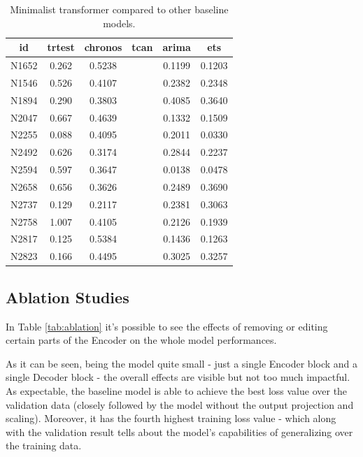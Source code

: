 \documentclass[algorithms,article,submit,pdftex,moreauthors]{Definitions/mdpi}
\begin{document}
\begin{table}[H]
	\caption{Minimalist transformer compared to other baseline models.}
	\label{tab:comparisons}
	\centering
	\begin{tabular}{c|ccccc}
		\toprule
		id   & trtest & chronos & tcan & arima & ets \\
		\midrule
		N1652 & 0.262 & 0.5238 & & 0.1199 & 0.1203 \\
		N1546 & 0.526 & 0.4107 & & 0.2382 & 0.2348 \\
		N1894 & 0.290 & 0.3803 & & 0.4085 & 0.3640 \\
		N2047 & 0.667 & 0.4639 & & 0.1332 & 0.1509 \\
		N2255 & 0.088 & 0.4095 & & 0.2011 & 0.0330 \\
		N2492 & 0.626 & 0.3174 & & 0.2844 & 0.2237 \\
		N2594 & 0.597 & 0.3647 & & 0.0138 & 0.0478 \\
		N2658 & 0.656 & 0.3626 & & 0.2489 & 0.3690 \\
		N2737 & 0.129 & 0.2117 & & 0.2381 & 0.3063 \\
		N2758 & 1.007 & 0.4105 & & 0.2126 & 0.1939 \\
		N2817 & 0.125 & 0.5384 & & 0.1436 & 0.1263 \\
		N2823 & 0.166 & 0.4495 & & 0.3025 & 0.3257 \\
		\bottomrule
	\end{tabular}
\end{table}

\subsection{Ablation Studies}

In Table \ref{tab:ablation} it's possible to see the effects of removing or editing certain parts of the Encoder on the whole model performances.

As it can be seen, being the model quite small - just a single Encoder block and a single Decoder block - the overall effects are visible but not too much impactful. As expectable, the baseline model is able to achieve the best loss value over the validation data (closely followed by the model without the output projection and scaling). Moreover, it has the fourth highest training loss value - which along with the validation result tells about the model's capabilities of generalizing over the training data.
\end{document}
